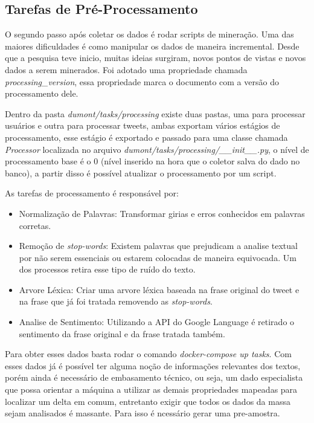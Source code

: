 \subsection{Tarefas de Pré-Processamento}
O segundo passo após coletar os dados é rodar scripts de mineração. Uma das maiores dificuldades é como manipular os dados de maneira incremental. Desde que a pesquisa teve inicio, muitas ideias surgiram, novos pontos de vistas e novos dados a serem minerados. Foi adotado uma propriedade chamada \textit{processing\_version}, essa propriedade marca o documento com a versão do processamento dele.

Dentro da pasta \textit{dumont/tasks/processing} existe duas pastas, uma para processar usuários e outra para processar tweets, ambas exportam vários estágios de processamento, esse estágio é exportado e passado para uma classe chamada \textit{Processor} localizada no arquivo \textit{dumont/tasks/processing/\_\_init\_\_.py}, o nível de processamento base é o 0 (nível inserido na hora que o coletor salva do dado no banco), a partir disso é possível atualizar o processamento por um script.

As tarefas de processamento é responsável por:

\begin{itemize}
    \item Normalização de Palavras: Transformar girias e erros conhecidos em palavras corretas.
    \item Remoção de \textit{stop-words}: Existem palavras que prejudicam a analise textual por não serem essenciais ou estarem colocadas de maneira equivocada. Um dos processos retira esse tipo de ruído do texto.
    \item Arvore Léxica: Criar uma arvore léxica baseada na frase original do tweet e na frase que já foi tratada removendo as \textit{stop-words}.
    \item Analise de Sentimento: Utilizando a API do Google Language é retirado o sentimento da frase original e da frase tratada também.
\end{itemize}

Para obter esses dados basta rodar o comando \textit{docker-compose up tasks}. Com esses dados já é possível ter alguma noção de informações relevantes dos textos, porém ainda é necessário de embasamento técnico, ou seja, um dado especialista que possa orientar a máquina a utilizar as demais propriedades mapeadas para localizar um delta em comum, entretanto exigir que todos os dados da massa sejam analisados é massante. Para isso é ncessário gerar uma pre-amostra.